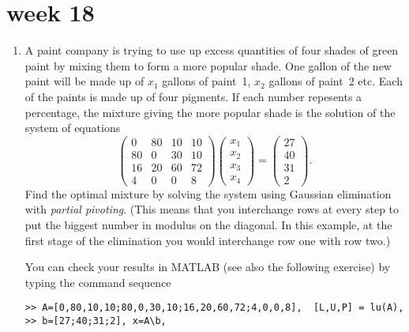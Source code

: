 \documentclass[11pt,a4paper]{article}
\begin{document}
\begin{enumerate}
%



\end{enumerate}

\vfill\eject

\section*{week 18}
\begin{enumerate}



\item\label{qdjsx3}
A paint company is trying to use up excess quantities of four shades
of green paint by mixing them to form a more popular shade. One gallon
of the new paint will be made up of $x_1$ gallons of paint~1, $x_2$
gallons of paint~2 etc. Each of the paints is made up of four
pigments. If each number repesents a percentage, 
the mixture giving the more popular shade is the solution of 
the system of equations
$$\left ( \begin{array}{rrrr}
         0 & 80 & 10 & 10 \\
        80 &  0 & 30 & 10 \\
        16 & 20 & 60 & 72 \\
         4 &  0 &  0 &  8 \end{array} \right )
   \left ( \begin{array}{c}
        x_1 \\ x_2 \\ x_3 \\ x_4 
            \end{array} \right) =
   \left ( \begin{array}{r}
        27 \\ 40 \\ 31 \\ 2 
            \end{array} \right) .$$
Find the optimal mixture by solving the system using Gaussian elimination 
with {\it partial pivoting}. (This means that you interchange rows at every step
to put the biggest number in modulus  on the diagonal. In this example,
 at the first stage of the elimination you would interchange row one with row two.)


You can check your results   in MATLAB (see also the following  exercise) by typing the command sequence
\begin{verbatim}
>> A=[0,80,10,10;80,0,30,10;16,20,60,72;4,0,0,8],  [L,U,P] = lu(A),
>> b=[27;40;31;2], x=A\b, 
\end{verbatim}



\end{enumerate}
\end{document}
